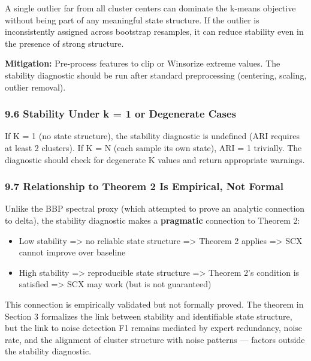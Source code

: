 \documentclass[
  12pt,
]{ctexart}
\providecommand{\tightlist}{%
  \setlength{\itemsep}{0pt}\setlength{\parskip}{0pt}}
\begin{document}
A single outlier far from all cluster centers can dominate the k-means
objective without being part of any meaningful state structure. If the
outlier is inconsistently assigned across bootstrap resamples, it can
reduce stability even in the presence of strong structure.

\textbf{Mitigation:} Pre-process features to clip or Winsorize extreme
values. The stability diagnostic should be run after standard
preprocessing (centering, scaling, outlier removal).

\subsubsection{9.6 Stability Under k = 1 or Degenerate
Cases}\label{stability-under-k-1-or-degenerate-cases}

If K = 1 (no state structure), the stability diagnostic is undefined
(ARI requires at least 2 clusters). If K = N (each sample its own
state), ARI = 1 trivially. The diagnostic should check for degenerate K
values and return appropriate warnings.

\subsubsection{9.7 Relationship to Theorem 2 Is Empirical, Not
Formal}\label{relationship-to-theorem-2-is-empirical-not-formal}

Unlike the BBP spectral proxy (which attempted to prove an analytic
connection to delta), the stability diagnostic makes a
\textbf{pragmatic} connection to Theorem 2:

\begin{itemize}
\tightlist
\item
  Low stability =\textgreater{} no reliable state structure
  =\textgreater{} Theorem 2 applies =\textgreater{} SCX cannot improve
  over baseline
\item
  High stability =\textgreater{} reproducible state structure
  =\textgreater{} Theorem 2's condition is satisfied =\textgreater{} SCX
  may work (but is not guaranteed)
\end{itemize}

This connection is empirically validated but not formally proved. The
theorem in Section 3 formalizes the link between stability and
identifiable state structure, but the link to noise detection F1 remains
mediated by expert redundancy, noise rate, and the alignment of cluster
structure with noise patterns --- factors outside the stability
diagnostic.
\end{document}
